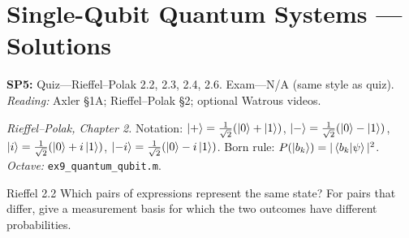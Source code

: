 \chapter{Single-Qubit Quantum Systems --- Solutions}

\noindent\textbf{SP5:} Quiz---Rieffel--Polak 2.2, 2.3, 2.4, 2.6. Exam---N/A (same style as quiz). \textit{Reading:} Axler \S1A; Rieffel--Polak \S2; optional Watrous videos.

\noindent\textit{Rieffel--Polak, Chapter 2.} Notation: $\left|+\right\rangle=\frac{1}{\sqrt{2}}(\left|0\right\rangle+\left|1\right\rangle)$, $\left|-\right\rangle=\frac{1}{\sqrt{2}}(\left|0\right\rangle-\left|1\right\rangle)$, $\left|i\right\rangle=\frac{1}{\sqrt{2}}(\left|0\right\rangle+i\left|1\right\rangle)$, $\left|-i\right\rangle=\frac{1}{\sqrt{2}}(\left|0\right\rangle-i\left|1\right\rangle)$. Born rule: $P(\left|b_k\right\rangle)=|\left\langle b_k\middle|\psi\right\rangle|^2$. \textit{Octave:} \texttt{ex9\_quantum\_qubit.m}.

\begin{exercise}{Rieffel 2.2}
Which pairs of expressions represent the same state? For pairs that differ, give a measurement basis for which the two outcomes have different probabilities.
\end{exercise}
